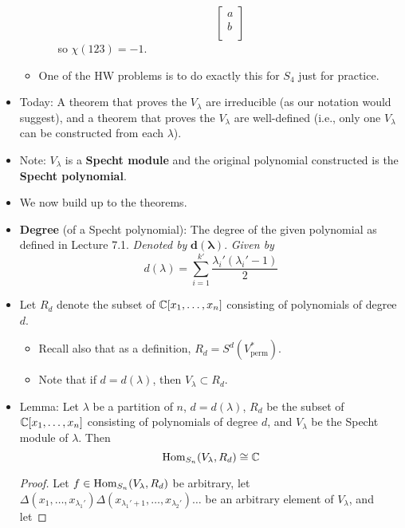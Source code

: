 \documentclass[../notes.tex]{subfiles}
\begin{document}
\begin{itemize}
\begin{itemize}
\begin{itemize}
\begin{equation*}
\begin{bmatrix}
                    a\\
                    b\\
                \end{bmatrix}
            \end{equation*}
            so $\chi(123)=-1$.
        \end{itemize}
        \item One of the HW problems is to do exactly this for $S_4$ just for practice.
    \end{itemize}
    \item Today: A theorem that proves the $V_\lambda$ are irreducible (as our notation would suggest), and a theorem that proves the $V_\lambda$ are well-defined (i.e., only one $V_\lambda$ can be constructed from each $\lambda$).
    \item Note: $V_\lambda$ is a \textbf{Specht module} and the original polynomial constructed is the \textbf{Specht polynomial}.
    \item We now build up to the theorems.
    \item \textbf{Degree} (of a Specht polynomial): The degree of the given polynomial as defined in Lecture 7.1. \emph{Denoted by} $\bm{d(\lambda)}$. \emph{Given by}
    \begin{equation*}
        d(\lambda) = \sum_{i=1}^{k'}\frac{\lambda_i'(\lambda_i'-1)}{2}
    \end{equation*}
    \item Let $R_d$ denote the subset of $\mathbb{C}[x_1,\dots,x_n]$ consisting of polynomials of degree $d$.
    \begin{itemize}
        \item Recall also that as a definition, $R_d=S^d(V_\text{perm}^*)$.
        \item Note that if $d=d(\lambda)$, then $V_\lambda\subset R_d$.
    \end{itemize}
    \item Lemma: Let $\lambda$ be a partition of $n$, $d=d(\lambda)$, $R_d$ be the subset of $\mathbb{C}[x_1,\dots,x_n]$ consisting of polynomials of degree $d$, and $V_\lambda$ be the Specht module of $\lambda$. Then
    \begin{equation*}
        \operatorname{Hom}_{S_n}(V_\lambda,R_d) \cong \mathbb{C}
    \end{equation*}
    \begin{proof}
        Let $f\in\operatorname{Hom}_{S_n}(V_\lambda,R_d)$ be arbitrary, let $\Delta(x_1,\dots,x_{\lambda_1'})\Delta(x_{\lambda_1'+1},\dots,x_{\lambda_2'})\dots$ be an arbitrary element of $V_\lambda$, and let

\end{proof}
\end{itemize}
\end{document}
